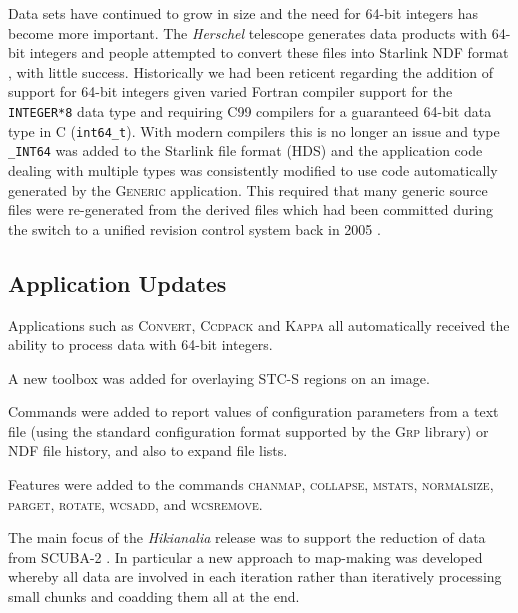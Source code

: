 \documentclass[11pt,twoside]{article}
\begin{document}
Data sets have continued to grow in size and the need for 64-bit
integers has become more important. The \textit{Herschel} telescope
generates data products with 64-bit integers and people attempted to
convert these files into Starlink NDF format \citep[see][for an
overview of NDF]{P91_adassxxiii}, with little success. Historically we
had been reticent regarding the addition of support for 64-bit
integers given varied Fortran compiler support for the
\texttt{INTEGER*8} data type and requiring C99 compilers for a
guaranteed 64-bit data type in C (\texttt{int64\_t}). With modern
compilers this is no longer an issue and type \texttt{\_INT64} was
added to the Starlink file format (HDS) and the application code
dealing with multiple types was consistently modified to use code
automatically generated by the \textsc{Generic} application. This
required that many generic source files were re-generated from the
derived files which had been committed during the switch to a unified
revision control system back in 2005 \citep{2005ASPC..347..119G}.

\subsection*{Application Updates}

Applications such as \textsc{Convert}, \textsc{Ccdpack} and
\textsc{Kappa} all automatically received the ability to process data
with 64-bit integers.


A new toolbox was added for overlaying STC-S regions on an image.


Commands were added to report values of configuration parameters from
a text file (using the standard configuration format supported by the
\textsc{Grp} library) or NDF file history, and also to expand file lists.

Features were added to the commands \textsc{chanmap},
\textsc{collapse}, \textsc{mstats}, \textsc{normalsize},
\textsc{parget}, \textsc{rotate}, \textsc{wcsadd}, and
\textsc{wcsremove}.


The main focus of the \textit{Hikianalia} release was to support the
reduction of data from SCUBA-2
\citep{2013MNRAS.430.2545C,2013MNRAS.430.2513H}. In particular a new
approach to map-making was developed whereby all data are involved in
each iteration rather than iteratively processing small chunks and
coadding them all at the end.
\end{document}
